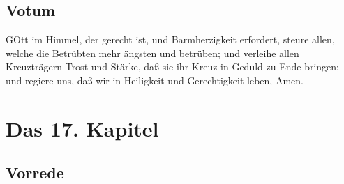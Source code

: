 \section{Votum}

GOtt im Himmel, der gerecht ist, und Barmherzigkeit erfordert, steure allen, welche die Betrübten mehr ängsten und betrüben; und verleihe allen Kreuzträgern Trost und Stärke, daß sie ihr Kreuz in Geduld zu Ende bringen; und regiere uns, daß wir in Heiligkeit und Gerechtigkeit leben, Amen.

\chapter{Das 17. Kapitel}

\section{Vorrede}

